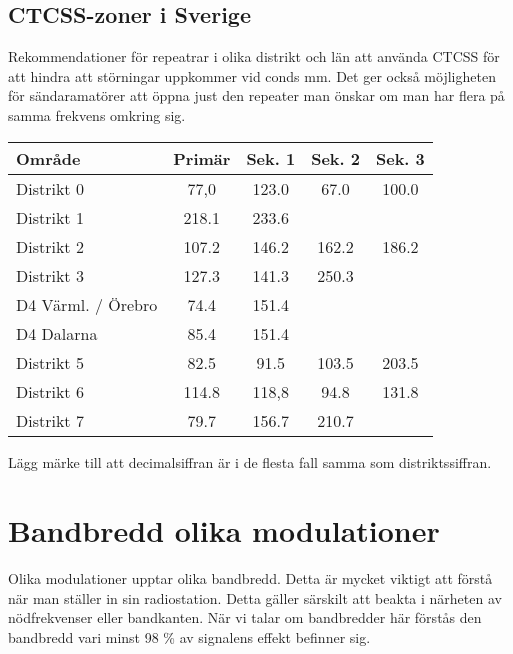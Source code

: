 \subsection{CTCSS-zoner i Sverige}

Rekommendationer för repeatrar i olika distrikt och län att använda CTCSS för att hindra att störningar uppkommer vid conds mm. Det ger också möjligheten för sändaramatörer att öppna just den repeater man önskar om man har flera på samma frekvens omkring sig.

\begin{tabular}{lcccc}
	\textbf{Område}    & \textbf{Primär} & \textbf{Sek. 1} & \textbf{Sek. 2} & \textbf{Sek. 3} \\ \hline
	Distrikt 0         & 77,0            & 123.0           & 67.0            & 100.0           \\
	Distrikt 1         & 218.1           & 233.6           &                 &                 \\
	Distrikt 2         & 107.2           & 146.2           & 162.2           & 186.2           \\
	Distrikt 3         & 127.3           & 141.3           & 250.3           &                 \\
	D4 Värml. / Örebro & 74.4            & 151.4           &                 &                 \\
	D4 Dalarna         & 85.4            & 151.4           &                 &                 \\
	Distrikt 5         & 82.5            & 91.5            & 103.5           & 203.5           \\
	Distrikt 6         & 114.8           & 118,8           & 94.8            & 131.8           \\
	Distrikt 7         & 79.7            & 156.7           & 210.7           & 
\end{tabular}

Lägg märke till att decimalsiffran är i de flesta fall samma som distriktssiffran.

\section{Bandbredd olika modulationer}

Olika modulationer upptar olika bandbredd. Detta är mycket viktigt att förstå när man ställer in sin radiostation. Detta gäller särskilt att beakta i närheten av nödfrekvenser eller bandkanten. När vi talar om bandbredder här förstås den bandbredd vari minst 98 \% av signalens effekt befinner sig.

